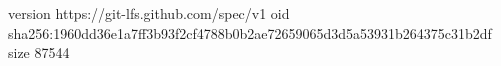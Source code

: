 version https://git-lfs.github.com/spec/v1
oid sha256:1960dd36e1a7ff3b93f2cf4788b0b2ae72659065d3d5a53931b264375c31b2df
size 87544
